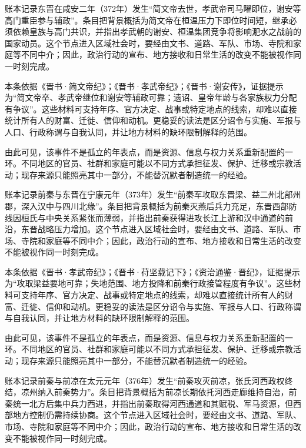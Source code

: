 账本记录东晋在咸安二年（372年）发生“简文帝去世，孝武帝司马曜即位，谢安等高门重臣参与辅政”。条目把背景概括为简文帝在桓温压力下即位时间短，继承必须依赖皇族与高门共识，并指出孝武朝的谢安、桓温集团竞争将影响淝水之战前的国家动员。这个节点进入区域社会时，要经由文书、道路、军队、市场、寺院和家庭等不同中介；因此，政治行动的宣布、地方接收和日常生活的改变不能被视作同一时刻完成。

本条依据《晋书·简文帝纪》；《晋书·孝武帝纪》；《晋书·谢安传》，证据提示为“简文帝卒、孝武帝继位和谢安等辅政可靠；遗诏、皇帝年龄与各家族权力分配有争议”。这些材料可支持年序、官方决定、战事或特定地点的线索，却难以直接统计所有人的财富、迁徙、信仰和动机。更稳妥的读法是区分诏令与实施、军报与人口、行政称谓与自我认同，并让地方材料的缺环限制解释的范围。

由此可见，该事件不是孤立的年表点，而是资源、信息与权力关系重新配置的一环。不同地区的官员、社群和家庭可能以不同方式承担征发、保护、迁移或宗教活动；现存来源只能照亮其中一部分，不能替沉默者制造统一的经验。

账本记录前秦与东晋在宁康元年（373年）发生“前秦军攻取东晋梁、益二州北部州郡，深入汉中与四川北缘”。条目把背景概括为前秦灭燕后兵力充足，东晋西部防线因桓氏与中央关系紧张而薄弱，并指出前秦获得进攻长江上游和汉中通道的前沿，东晋战略压力增加。这个节点进入区域社会时，要经由文书、道路、军队、市场、寺院和家庭等不同中介；因此，政治行动的宣布、地方接收和日常生活的改变不能被视作同一时刻完成。

本条依据《晋书·孝武帝纪》；《晋书·苻坚载记下》；《资治通鉴·晋纪》，证据提示为“攻取梁益要地可靠；失地范围、地方投降和前秦行政接管程度有争议”。这些材料可支持年序、官方决定、战事或特定地点的线索，却难以直接统计所有人的财富、迁徙、信仰和动机。更稳妥的读法是区分诏令与实施、军报与人口、行政称谓与自我认同，并让地方材料的缺环限制解释的范围。

由此可见，该事件不是孤立的年表点，而是资源、信息与权力关系重新配置的一环。不同地区的官员、社群和家庭可能以不同方式承担征发、保护、迁移或宗教活动；现存来源只能照亮其中一部分，不能替沉默者制造统一的经验。

账本记录前秦与前凉在太元元年（376年）发生“前秦攻灭前凉，张氏河西政权终结，凉州纳入前秦势力”。条目把背景概括为前凉长期依托河西走廊维持自治，前秦统一北方后集中兵力西进，并指出前秦取得河西通道和其赋税、军马资源，但西部地方控制仍需持续协商。这个节点进入区域社会时，要经由文书、道路、军队、市场、寺院和家庭等不同中介；因此，政治行动的宣布、地方接收和日常生活的改变不能被视作同一时刻完成。

